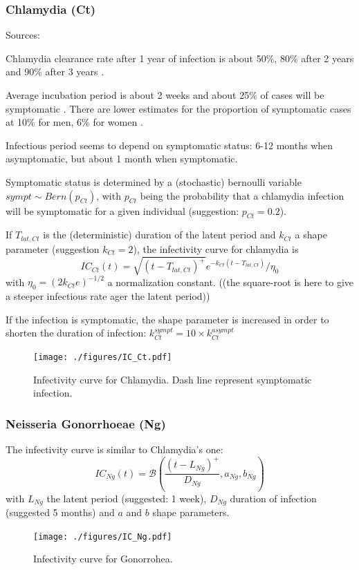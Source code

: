 \documentclass[11pt, onecolumn]{article}
\begin{document}
\subsubsection{Chlamydia (Ct)}

Sources: \cite{Geisler:2010bc, Althaus:2011dc}

Chlamydia clearance rate after 1 year of infection is about 50\%, 80\% after 2 years and 90\% after 3 years \cite{Geisler:2010bc}.

Average incubation period is about 2 weeks and about 25\% of cases will be symptomatic \cite{Althaus:2011dc}. There are lower estimates for the proportion of symptomatic cases at 10\% for men, 6\% for women \cite{Kretzschmar:1996ur}.

Infectious period seems to depend on symptomatic status: 6-12 months when asymptomatic, but about 1 month when symptomatic\cite{Kretzschmar:1996ur}.

Symptomatic status is determined by a (stochastic) bernoulli variable $sympt\sim Bern(p_{Ct})$, with $p_{Ct}$ being the probability that a chlamydia infection will be symptomatic for a given individual (suggestion: $p_{Ct}=0.2$).

If $T_{lat,Ct}$ is the (deterministic) duration of the latent period and $k_{Ct}$ a shape parameter (suggestion $k_{Ct}=2$), the infectivity curve for chlamydia is
$$IC_{Ct}(t) = \sqrt{(t-T_{lat,Ct})^+}e^{-k_{Ct} (t-T_{lat,Ct})}/\eta_0$$
with $\eta_0=(2k_{Ct}e)^{-1/2}$ a normalization constant. ((the square-root is here to give a steeper infectious rate ager the latent period))

If the infection is symptomatic, the shape parameter is increased in order to shorten the duration of infection: $k_{Ct}^{sympt} =10\times k_{Ct}^{asympt}$

\begin{figure}[!ht]
\centering
    \texttt{[image: ./figures/IC\_Ct.pdf]}
\caption{Infectivity curve for Chlamydia. Dash line represent symptomatic infection.}
\label{fig:ICCt}
\end{figure}



\subsubsection{Neisseria Gonorrhoeae (Ng)}

 The infectivity curve is similar to Chlamydia's one:
$$IC_{Ng}(t) = \mathcal{B}\left(\frac{(t-L_{Ng})^+}{D_{Ng}},a_{Ng},b_{Ng}\right)$$
with $L_{Ng}$ the latent period (suggested: 1 week), $D_{Ng}$ duration of infection (suggested 5 months) and $a$ and $b$ shape parameters.
\begin{figure}[!ht]
\centering
    \texttt{[image: ./figures/IC\_Ng.pdf]}
\caption{Infectivity curve for Gonorrohea.}
\label{fig:ICNg}
\end{figure} 
\end{document}
